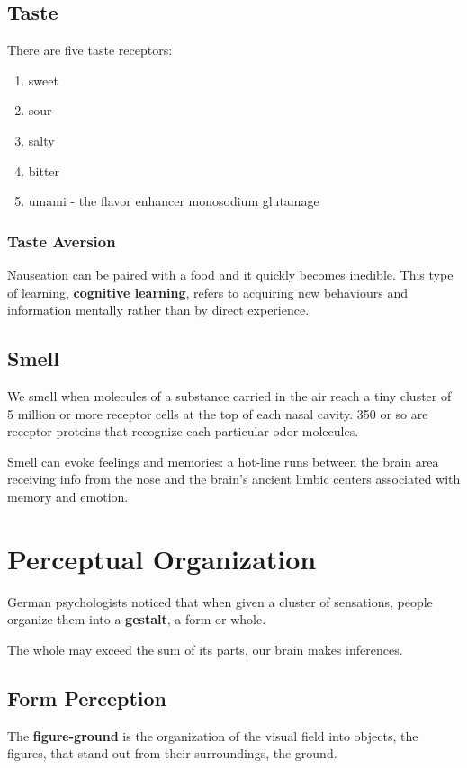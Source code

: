 \documentclass[12pt]{article}
\begin{document}
\subsection*{Taste}
There are five taste receptors:
\begin{enumerate}
\item sweet
\item sour
\item salty
\item bitter
\item umami - the flavor enhancer monosodium glutamage
\end{enumerate}

\subsubsection*{Taste Aversion}
Nauseation can be paired with a food and it quickly becomes inedible. This type of learning, {\bf cognitive learning}, refers to acquiring new behaviours and information mentally rather than by direct experience. 

\subsection*{Smell}
We smell when molecules of a substance carried in the air reach a tiny cluster of 5 million or more receptor cells at the top of each nasal cavity. 350 or so are receptor proteins that recognize each particular odor molecules.

Smell can evoke feelings and memories: a hot-line runs between the brain area receiving info from the nose and the brain's ancient limbic centers associated with memory and emotion. 

\section*{Perceptual Organization}
German psychologists noticed that when given a cluster of sensations, people organize them into a \textbf{gestalt}, a form or whole.

The whole may exceed the sum of its parts, our brain makes inferences.

\subsection*{Form Perception}
The \textbf{figure-ground} is the organization of the visual field into objects, the figures, that stand out from their surroundings, the ground.
\end{document}
